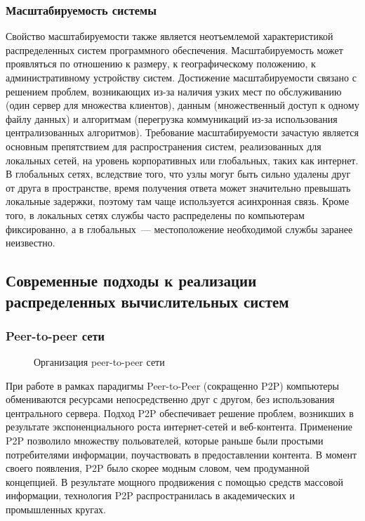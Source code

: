 \subsubsection{Масштабируемость системы}
Свойство масштабируемости также является неотъемлемой характеристикой распределенных систем программного обеспечения. Масштабируемость может проявляться по отношению к размеру, к географическому положению, к административному устройству систем. Достижение масштабируемости связано с решением проблем, возникающих из-за наличия узких мест по обслуживанию (один сервер для множества клиентов), данным (множественный доступ к одному файлу данных) и алгоритмам (перегрузка коммуникаций из-за использования централизованных алгоритмов). Требование масштабируемости зачастую является основным препятствием для распространения систем, реализованных для локальных сетей, на уровень корпоративных или глобальных, таких как интернет. В глобальных сетях, вследствие того, что узлы могуг быть сильно удалены друг от друга в пространстве, время получения ответа может значительно превышать локальные задержки, поэтому там чаще используется асинхронная связь. Кроме того, в локальных сетях службы часто распределены по компьютерам фиксированно, а в глобальных~--- местоположение необходимой службы заранее неизвестно.

\subsection{Современные подходы к реализации распределенных вычислительных систем}
\subsubsection{Peer-to-peer сети}
\begin{figure}[h]
\caption{Организация peer-to-peer сети}
\label{0:peer}
\end{figure}

При работе в рамках парадигмы Peer-to-Peer (сокращенно P2P) компьютеры обмениваются ресурсами непосредственно друг с другом, без использования центрального сервера. Подход P2P обеспечивает решение проблем, возникших в результате экспоненциального роста интернет-сетей и веб-контента. Применение P2P позволило множеству польователей, которые раньше были простыми потребителями информации, поучаствовать в предоставлении контента. В момент своего появления, P2P было скорее модным словом, чем продуманной концепцией. В результате мощного продвижения с помощью средств массовой информации, технология P2P распространилась в академических и промышленных кругах.

